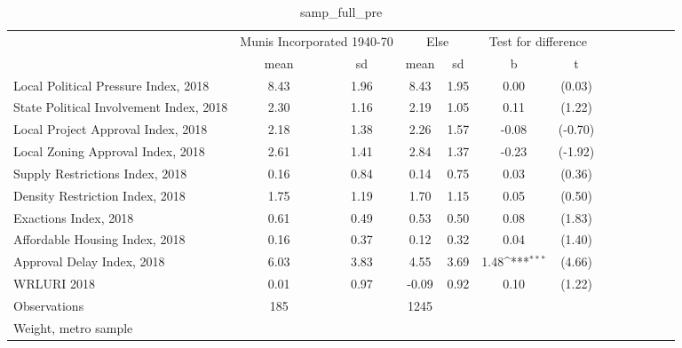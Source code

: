\begin{table}[htbp]\centering
\def\sym#1{\ifmmode^{#1}\else\(^{#1}\)\fi}
\caption{samp\_full\_pre \label{tab1}}
\begin{tabular}{l*{3}{cccc}}
\toprule
                    &\multicolumn{2}{c}{Munis Incorporated 1940-70}&\multicolumn{2}{c}{Else} &\multicolumn{2}{c}{Test for difference}\\
                    &        mean&          sd&        mean&          sd&           b         &           t\\
\midrule
Local Political Pressure Index, 2018&        8.43&        1.96&        8.43&        1.95&        0.00         &      (0.03)\\
State Political Involvement Index, 2018&        2.30&        1.16&        2.19&        1.05&        0.11         &      (1.22)\\
Local Project Approval Index, 2018&        2.18&        1.38&        2.26&        1.57&       -0.08         &     (-0.70)\\
Local Zoning Approval Index, 2018&        2.61&        1.41&        2.84&        1.37&       -0.23         &     (-1.92)\\
Supply Restrictions Index, 2018&        0.16&        0.84&        0.14&        0.75&        0.03         &      (0.36)\\
Density Restriction Index, 2018&        1.75&        1.19&        1.70&        1.15&        0.05         &      (0.50)\\
Exactions Index, 2018&        0.61&        0.49&        0.53&        0.50&        0.08         &      (1.83)\\
Affordable Housing Index, 2018&        0.16&        0.37&        0.12&        0.32&        0.04         &      (1.40)\\
Approval Delay Index, 2018&        6.03&        3.83&        4.55&        3.69&        1.48\sym{***}&      (4.66)\\
WRLURI 2018         &        0.01&        0.97&       -0.09&        0.92&        0.10         &      (1.22)\\
\midrule
Observations        &         185&            &        1245&            &                     &            \\
\bottomrule
\multicolumn{7}{l}{\footnotesize Weight, metro sample}\\
\end{tabular}
\end{table}
